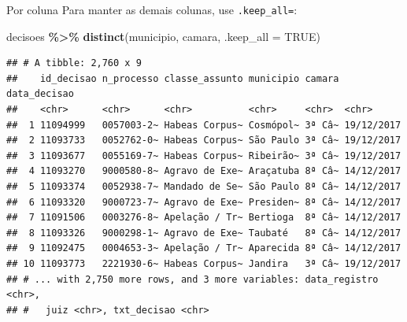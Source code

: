 \documentclass[
  10pt,
  ignorenonframetext,
]{beamer}
\newenvironment{Shaded}{\begin{snugshade}}{\end{snugshade}}
\newcommand{\DataTypeTok}[1]{\textcolor[rgb]{0.13,0.29,0.53}{#1}}
\newcommand{\KeywordTok}[1]{\textcolor[rgb]{0.13,0.29,0.53}{\textbf{#1}}}
\newcommand{\NormalTok}[1]{#1}
\newcommand{\OperatorTok}[1]{\textcolor[rgb]{0.81,0.36,0.00}{\textbf{#1}}}
\newcommand{\OtherTok}[1]{\textcolor[rgb]{0.56,0.35,0.01}{#1}}
\newcommand{\StringTok}[1]{\textcolor[rgb]{0.31,0.60,0.02}{#1}}
\begin{document}
\begin{frame}[fragile]{Por coluna}
\protect\hypertarget{por-coluna}{}
Para manter as demais colunas, use \texttt{.keep\_all=}:

\begin{Shaded}
\begin{Highlighting}[]
\NormalTok{decisoes }\OperatorTok{\%\textgreater{}\%}
\StringTok{  }\KeywordTok{distinct}\NormalTok{(municipio, camara, }
           \DataTypeTok{.keep\_all =} \OtherTok{TRUE}\NormalTok{)}
\end{Highlighting}
\end{Shaded}

\begin{verbatim}
## # A tibble: 2,760 x 9
##    id_decisao n_processo classe_assunto municipio camara data_decisao
##    <chr>      <chr>      <chr>          <chr>     <chr>  <chr>       
##  1 11094999   0057003-2~ Habeas Corpus~ Cosmópol~ 3ª Câ~ 19/12/2017  
##  2 11093733   0052762-0~ Habeas Corpus~ São Paulo 3ª Câ~ 19/12/2017  
##  3 11093677   0055169-7~ Habeas Corpus~ Ribeirão~ 3ª Câ~ 19/12/2017  
##  4 11093270   9000580-8~ Agravo de Exe~ Araçatuba 8ª Câ~ 14/12/2017  
##  5 11093374   0052938-7~ Mandado de Se~ São Paulo 8ª Câ~ 14/12/2017  
##  6 11093320   9000723-7~ Agravo de Exe~ Presiden~ 8ª Câ~ 14/12/2017  
##  7 11091506   0003276-8~ Apelação / Tr~ Bertioga  8ª Câ~ 14/12/2017  
##  8 11093326   9000298-1~ Agravo de Exe~ Taubaté   8ª Câ~ 14/12/2017  
##  9 11092475   0004653-3~ Apelação / Tr~ Aparecida 8ª Câ~ 14/12/2017  
## 10 11093773   2221930-6~ Habeas Corpus~ Jandira   3ª Câ~ 19/12/2017  
## # ... with 2,750 more rows, and 3 more variables: data_registro <chr>,
## #   juiz <chr>, txt_decisao <chr>
\end{verbatim}
\end{frame}
\end{document}
